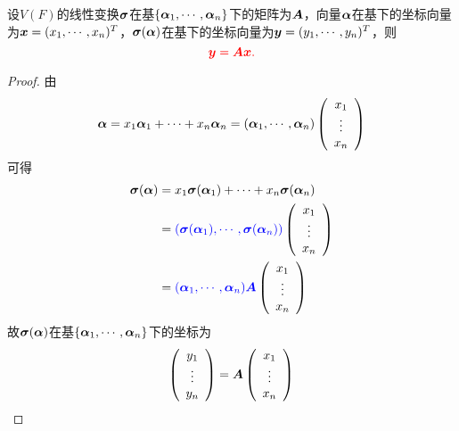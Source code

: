 \begin{frame}
  \begin{dingli}
    设$V(F)$的线性变换$\boldsymbol{\sigma}$在基$\{\boldsymbol{\alpha}_1,\cdots,\boldsymbol{\alpha}_n\}$下的矩阵为$\boldsymbol{A}$，向量$\boldsymbol{\alpha}$在基下的坐标向量为${\boldsymbol{x}}=(x_1,\cdots,x_n)^T$，$\boldsymbol{\sigma}(\boldsymbol{\alpha})$在基下的坐标向量为${\boldsymbol{y}}=(y_1,\cdots,y_n)^T$，则
    $$
    \textcolor{red}{{\boldsymbol{y}}=\boldsymbol{A}{\boldsymbol{x}}.}
    $$
  \end{dingli} \vspace{.1in} \pause 

  \begin{proof}
    由
    $$
    \boldsymbol{\alpha}=x_1\boldsymbol{\alpha}_1+\cdots+x_n\boldsymbol{\alpha}_n=(\boldsymbol{\alpha}_1,\cdots,\boldsymbol{\alpha}_n)\left(\begin{array}{c}x_1\\\vdots\\x_n\end{array}\right)
    $$
    可得
    $$
    \begin{aligned}
      \boldsymbol{\sigma}(\boldsymbol{\alpha})&=x_1\boldsymbol{\sigma}(\boldsymbol{\alpha}_1)+\cdots+x_n\boldsymbol{\sigma}(\boldsymbol{\alpha}_n)\\
      &=\textcolor{blue}{(\boldsymbol{\sigma}(\boldsymbol{\alpha}_1),\cdots,\boldsymbol{\sigma}(\boldsymbol{\alpha}_n))}\left(\begin{array}{c}x_1\\\vdots\\x_n\end{array}\right)\\
      &=\textcolor{blue}{(\boldsymbol{\alpha}_1,\cdots,\boldsymbol{\alpha}_n)\boldsymbol{A}}\left(\begin{array}{c}x_1\\\vdots\\x_n\end{array}\right)
    \end{aligned}
    $$
    故$\boldsymbol{\sigma}(\boldsymbol{\alpha})$在基$\{\boldsymbol{\alpha}_1,\cdots,\boldsymbol{\alpha}_n\}$下的坐标为
    $$
    \left(\begin{array}{c}y_1\\\vdots\\y_n\end{array}\right)=\boldsymbol{A}\left(\begin{array}{c}x_1\\\vdots\\x_n\end{array}\right)
    $$
  \end{proof}
\end{frame}

